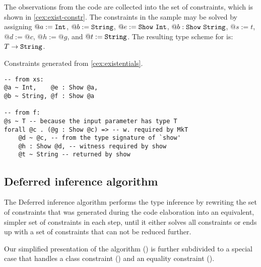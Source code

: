 The observations from the code are collected into the set of constraints, which is shown in \cref{cex:exist-constr}. The constraints in the sample may be solved by assigning $@a := \mathtt{Int}$, $@b := \mathtt{String}$, $@e := \mathtt{Show}\ \mathtt{Int}$, $@b : \mathtt{Show}\ \mathtt{String}$, $@s := t$, $@d := @c$, $@h := @g$, and $@t := \mathtt{String}$. The resulting type scheme for  is: $T \to \mathtt{String}$.

\begin{codex}
\caption{Constraints generated from \cref{cex:existentials}.}
\label{cex:exist-constr}
\begin{lstlisting}[style=haskellStyle]
-- from xs:
@a ~ Int,    @e : Show @a,
@b ~ String, @f : Show @a

-- from f:
@s ~ T -- because the input parameter has type T
forall @c . (@g : Show @c) => -- w. required by MkT
    @d ~ @c, -- from the type signature of `show'
    @h : Show @d, -- witness required by show
    @t ~ String -- returned by show
\end{lstlisting}
\end{codex}

\FloatBarrier
\subsection{Deferred inference algorithm}

The Deferred inference algorithm performs the type inference by rewriting the set of constraints that was generated during the code elaboration into an equivalent, simpler set of constraints in each step, until it either solves all constraints or ends up with a set of constraints that can not be reduced further. \cite{peytonjones2019type}

Our simplified presentation of the algorithm () is further subdivided to a special case that handles a class constraint () and an equality constraint ().

